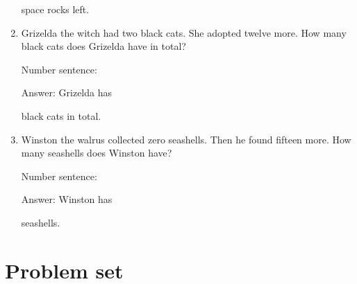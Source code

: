 \documentclass{tufte-book}
\begin{document}
\begin{enumerate}
  space rocks left.
\item
  Grizelda the witch had two black cats. She adopted twelve more. How
  many black cats does Grizelda have in total?\medskip\par
  Number sentence:
  \dotfill\medskip\par
  Answer: Grizelda has
  \dotfill\medskip\par\mbox{}\dotfill\medskip\par\mbox{}\dotfill\bigskip
  black cats in total.
\item
  Winston the walrus collected zero seashells. Then he found fifteen
  more. How many seashells does Winston have?\medskip\par
  Number sentence:
  \dotfill\medskip\par
  Answer: Winston has
  \dotfill\medskip\par\mbox{}\dotfill\medskip\par\mbox{}\dotfill\bigskip
  seashells.
\end{enumerate}



\clearpage\section{Problem set }
\end{document}

